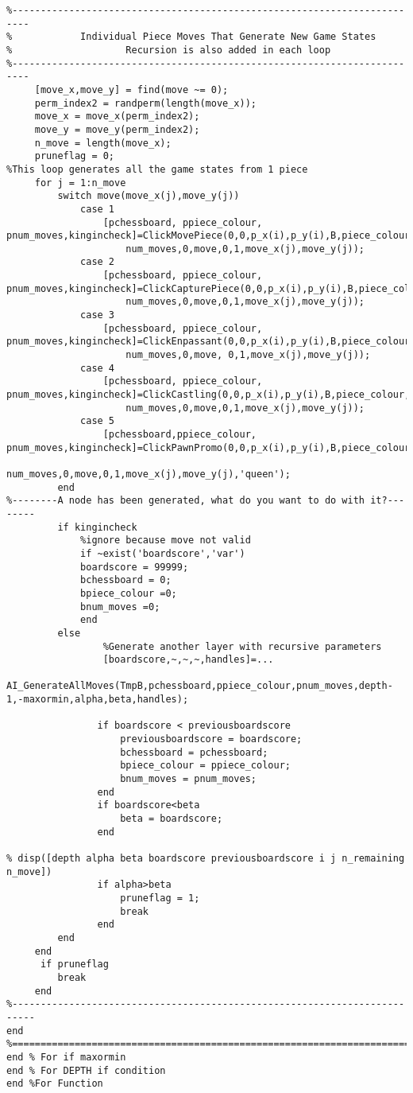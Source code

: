 \documentclass{article}
\begin{document}
\begin{lstlisting}
%-------------------------------------------------------------------------
%            Individual Piece Moves That Generate New Game States
%                    Recursion is also added in each loop
%-------------------------------------------------------------------------
     [move_x,move_y] = find(move ~= 0);
     perm_index2 = randperm(length(move_x));
     move_x = move_x(perm_index2);
     move_y = move_y(perm_index2);
     n_move = length(move_x);
     pruneflag = 0;
%This loop generates all the game states from 1 piece
     for j = 1:n_move
         switch move(move_x(j),move_y(j))
             case 1
                 [pchessboard, ppiece_colour, pnum_moves,kingincheck]=ClickMovePiece(0,0,p_x(i),p_y(i),B,piece_colour,chessboard,...
                     num_moves,0,move,0,1,move_x(j),move_y(j));
             case 2
                 [pchessboard, ppiece_colour, pnum_moves,kingincheck]=ClickCapturePiece(0,0,p_x(i),p_y(i),B,piece_colour,chessboard,...
                     num_moves,0,move,0,1,move_x(j),move_y(j));
             case 3
                 [pchessboard, ppiece_colour, pnum_moves,kingincheck]=ClickEnpassant(0,0,p_x(i),p_y(i),B,piece_colour,chessboard,...
                     num_moves,0,move, 0,1,move_x(j),move_y(j));
             case 4
                 [pchessboard, ppiece_colour, pnum_moves,kingincheck]=ClickCastling(0,0,p_x(i),p_y(i),B,piece_colour,chessboard,...
                     num_moves,0,move,0,1,move_x(j),move_y(j));
             case 5
                 [pchessboard,ppiece_colour, pnum_moves,kingincheck]=ClickPawnPromo(0,0,p_x(i),p_y(i),B,piece_colour,chessboard,...
                     num_moves,0,move,0,1,move_x(j),move_y(j),'queen');
         end
%--------A node has been generated, what do you want to do with it?--------
         if kingincheck  
             %ignore because move not valid
             if ~exist('boardscore','var')
             boardscore = 99999;
             bchessboard = 0;
             bpiece_colour =0;
             bnum_moves =0;
             end
         else
                 %Generate another layer with recursive parameters
                 [boardscore,~,~,~,handles]=...
            AI_GenerateAllMoves(TmpB,pchessboard,ppiece_colour,pnum_moves,depth-1,-maxormin,alpha,beta,handles);
        
                if boardscore < previousboardscore
                    previousboardscore = boardscore;
                    bchessboard = pchessboard;
                    bpiece_colour = ppiece_colour;
                    bnum_moves = pnum_moves;
                end
                if boardscore<beta
                    beta = boardscore;
                end
                
% disp([depth alpha beta boardscore previousboardscore i j n_remaining n_move])
                if alpha>beta
                    pruneflag = 1;
                    break
                end
         end
     end
      if pruneflag
         break
     end
%--------------------------------------------------------------------------
end
%=========================================================================
end % For if maxormin
end % For DEPTH if condition
end %For Function
\end{lstlisting}
\end{document}
